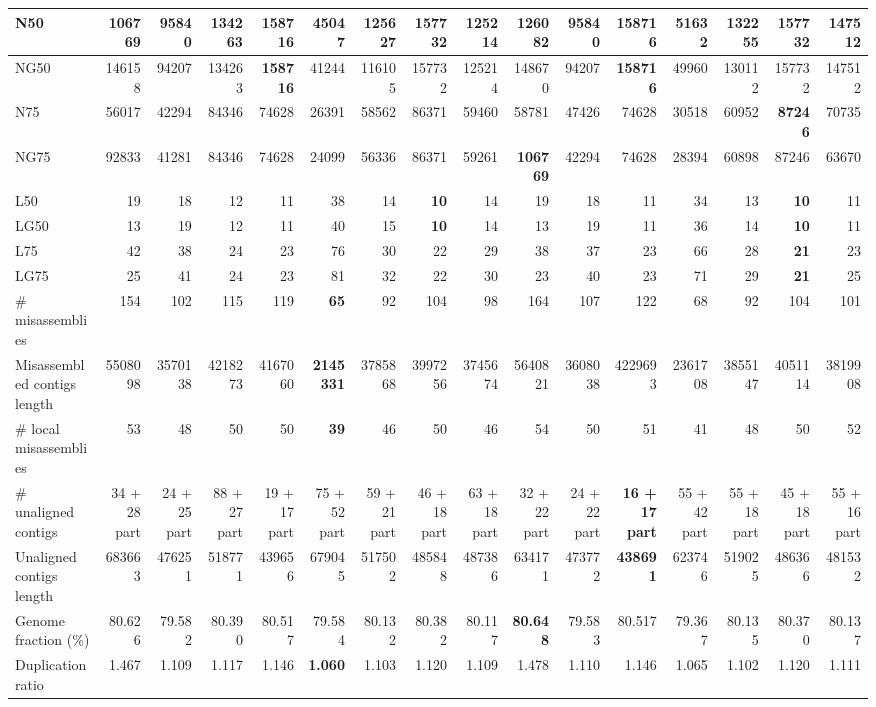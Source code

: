 \documentclass[12pt,a4paper]{article}
\begin{document}
\begin{table}[ht]
\begin{center}
\begin{tabular}{|l*{15}{|r}|}
N50 & 106769 & 95840 & 134263 & {\bf 158716} & 45047 & 125627 & 157732 & 125214 & 126082 & 95840 & {\bf 158716} & 51632 & 132255 & 157732 & 147512 \\ \hline
NG50 & 146158 & 94207 & 134263 & {\bf 158716} & 41244 & 116105 & 157732 & 125214 & 148670 & 94207 & {\bf 158716} & 49960 & 130112 & 157732 & 147512 \\ \hline
N75 & 56017 & 42294 & 84346 & 74628 & 26391 & 58562 & 86371 & 59460 & 58781 & 47426 & 74628 & 30518 & 60952 & {\bf 87246} & 70735 \\ \hline
NG75 & 92833 & 41281 & 84346 & 74628 & 24099 & 56336 & 86371 & 59261 & {\bf 106769} & 42294 & 74628 & 28394 & 60898 & 87246 & 63670 \\ \hline
L50 & 19 & 18 & 12 & 11 & 38 & 14 & {\bf 10} & 14 & 19 & 18 & 11 & 34 & 13 & {\bf 10} & 11 \\ \hline
LG50 & 13 & 19 & 12 & 11 & 40 & 15 & {\bf 10} & 14 & 13 & 19 & 11 & 36 & 14 & {\bf 10} & 11 \\ \hline
L75 & 42 & 38 & 24 & 23 & 76 & 30 & 22 & 29 & 38 & 37 & 23 & 66 & 28 & {\bf 21} & 23 \\ \hline
LG75 & 25 & 41 & 24 & 23 & 81 & 32 & 22 & 30 & 23 & 40 & 23 & 71 & 29 & {\bf 21} & 25 \\ \hline
\# misassemblies & 154 & 102 & 115 & 119 & {\bf 65} & 92 & 104 & 98 & 164 & 107 & 122 & 68 & 92 & 104 & 101 \\ \hline
Misassembled contigs length & 5508098 & 3570138 & 4218273 & 4167060 & {\bf 2145331} & 3785868 & 3997256 & 3745674 & 5640821 & 3608038 & 4229693 & 2361708 & 3855147 & 4051114 & 3819908 \\ \hline
\# local misassemblies & 53 & 48 & 50 & 50 & {\bf 39} & 46 & 50 & 46 & 54 & 50 & 51 & 41 & 48 & 50 & 52 \\ \hline
\# unaligned contigs & 34 + 28 part & 24 + 25 part & 88 + 27 part & 19 + 17 part & 75 + 52 part & 59 + 21 part & 46 + 18 part & 63 + 18 part & 32 + 22 part & 24 + 22 part & {\bf 16 + 17 part} & 55 + 42 part & 55 + 18 part & 45 + 18 part & 55 + 16 part \\ \hline
Unaligned contigs length & 683663 & 476251 & 518771 & 439656 & 679045 & 517502 & 485848 & 487386 & 634171 & 473772 & {\bf 438691} & 623746 & 519025 & 486366 & 481532 \\ \hline
Genome fraction (\%) & 80.626 & 79.582 & 80.390 & 80.517 & 79.584 & 80.132 & 80.382 & 80.117 & {\bf 80.648} & 79.583 & 80.517 & 79.367 & 80.135 & 80.370 & 80.137 \\ \hline
Duplication ratio & 1.467 & 1.109 & 1.117 & 1.146 & {\bf 1.060} & 1.103 & 1.120 & 1.109 & 1.478 & 1.110 & 1.146 & 1.065 & 1.102 & 1.120 & 1.111 \\ \hline

\end{tabular}
\end{center}
\end{table}
\end{document}
